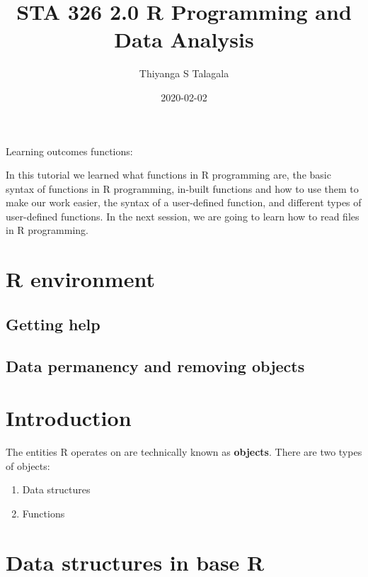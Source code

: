 \documentclass[]{book}
\title{STA 326 2.0 R Programming and Data Analysis}
\author{Thiyanga S Talagala}
\date{2020-02-02}
\begin{document}
\maketitle

{
\setcounter{tocdepth}{1}
\tableofcontents
}
Learning outcomes functions:

In this tutorial we learned what functions in R programming are, the basic syntax of functions in R programming, in-built functions and how to use them to make our work easier, the syntax of a user-defined function, and different types of user-defined functions. In the next session, we are going to learn how to read files in R programming.

\hypertarget{elements}{%
\chapter{R environment}\label{elements}}

\hypertarget{getting-help}{%
\section{Getting help}\label{getting-help}}

\hypertarget{data-permanency-and-removing-objects}{%
\section{Data permanency and removing objects}\label{data-permanency-and-removing-objects}}

\hypertarget{intro}{%
\chapter{Introduction}\label{intro}}

The entities R operates on are technically known as \textbf{objects}. There are two types of objects:

\begin{enumerate}
\def\labelenumi{\arabic{enumi}.}
\item
  Data structures
\item
  Functions
\end{enumerate}

\hypertarget{data-structures-in-base-r}{%
\chapter{Data structures in base R}\label{data-structures-in-base-r}}
\end{document}
